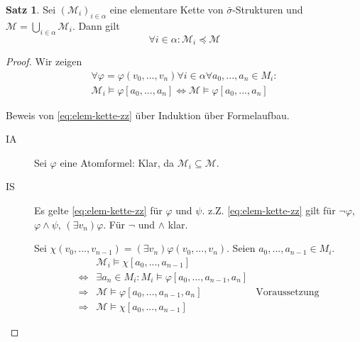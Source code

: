 \documentclass{article}
\theoremstyle{definition}
\newtheorem{satz}[dfn]{Satz}
\theoremstyle{plain}
\newcommand{\m}[1]{\mathcal{#1}}
\begin{document}
    \begin{satz}
        Sei $ (\m{M}_i)_{i \in \alpha} $ eine elementare Kette von $ \bar{\sigma} $-Strukturen und $ \m{M} = \bigcup_{i \in \alpha} \m{M}_i $.
        Dann gilt
        \begin{equation*}
            \forall i \in \alpha: \m{M}_i \preceq \m{M}
        \end{equation*}
    \end{satz}

    \begin{proof}
        Wir zeigen
        \begin{equation}
        \label{eq:elem-kette-zz}
            \begin{aligned}
                \forall \varphi = \varphi(v_0, ..., v_n) \forall i \in \alpha \forall a_0, ..., a_n \in M_i: \\ \m{M}_i \models \varphi[a_0, ..., a_n] \Leftrightarrow \m{M} \models \varphi[a_0, ..., a_n]
            \end{aligned}
        \end{equation}

        Beweis von \eqref{eq:elem-kette-zz} über Induktion über Formelaufbau.
        \begin{description}
            \item[IA] Sei $ \varphi $ eine Atomformel: Klar, da $ \m{M}_i \subseteq \m{M} $.
            \item[IS] Es gelte \eqref{eq:elem-kette-zz} für $ \varphi $ und $ \psi $.
            z.Z. \eqref{eq:elem-kette-zz} gilt für $ \neg \varphi $, $ \varphi \land \psi $, $ (\exists v_n) \varphi $.
            Für $ \neg $ und $ \land $ klar.

            Sei $ \chi(v_0, ..., v_{n -1 }) = (\exists v_n) \varphi(v_0, ..., v_n) $.
            Seien $ a_0, ..., a_{n - 1} \in M_i $.
            \begin{align*}
                & \m{M}_i \models \chi[a_0, ..., a_{n - 1}] \\
                \Leftrightarrow & \exists a_n \in M_i: M_i \models \varphi[a_0, ..., a_{n - 1}, a_n] \\
                \Rightarrow & \m{M} \models \varphi[a_0, ..., a_{n - 1}, a_n] & \text{Voraussetzung} \\
                \Rightarrow & \m{M} \models \chi[a_0, ..., a_{n - 1}]
            \end{align*}


\end{description}
\end{proof}
\end{document}

